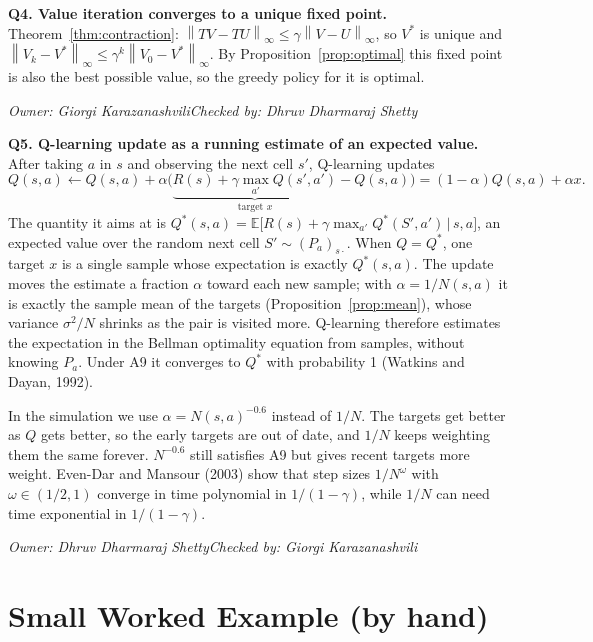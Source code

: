 \documentclass[10pt]{article}
\theoremstyle{definition}
\newcommand{\GK}{Giorgi Karazanashvili}
\newcommand{\DS}{Dhruv Dharmaraj Shetty}
\newcommand{\signoff}[2]{\par\smallskip\hfill\emph{Owner: #1}\qquad\emph{Checked by: #2}\par\medskip}
\newcommand{\E}{\mathbb{E}}
\newcommand{\norm}[1]{\left\lVert #1\right\rVert_\infty}
\begin{document}
\noindent\textbf{Q4. Value iteration converges to a unique fixed point.} Theorem~\ref{thm:contraction}: $\norm{TV-TU}\le\gamma\norm{V-U}$, so $V^*$ is unique and $\norm{V_k-V^*}\le\gamma^k\norm{V_0-V^*}$. By Proposition~\ref{prop:optimal} this fixed point is also the best possible value, so the greedy policy for it is optimal.
\signoff{\GK}{\DS}

\noindent\textbf{Q5. Q-learning update as a running estimate of an expected value.} After taking $a$ in $s$ and observing the next cell $s'$, Q-learning updates
\[
Q(s,a)\leftarrow Q(s,a) + \alpha\Big(\underbrace{R(s) + \gamma\max_{a'}Q(s',a')}_{\text{target }x} - Q(s,a)\Big) = (1-\alpha)Q(s,a) + \alpha x.
\]
The quantity it aims at is $Q^*(s,a) = \E\big[R(s) + \gamma\max_{a'}Q^*(S',a')\,\big|\,s,a\big]$, an expected value over the random next cell $S'\sim(P_a)_{s\cdot}$. When $Q = Q^*$, one target $x$ is a single sample whose expectation is exactly $Q^*(s,a)$. The update moves the estimate a fraction $\alpha$ toward each new sample; with $\alpha = 1/N(s,a)$ it is exactly the sample mean of the targets (Proposition~\ref{prop:mean}), whose variance $\sigma^2/N$ shrinks as the pair is visited more. Q-learning therefore estimates the expectation in the Bellman optimality equation from samples, without knowing $P_a$. Under A9 it converges to $Q^*$ with probability 1 (Watkins and Dayan, 1992).

In the simulation we use $\alpha = N(s,a)^{-0.6}$ instead of $1/N$. The targets get better as $Q$ gets better, so the early targets are out of date, and $1/N$ keeps weighting them the same forever. $N^{-0.6}$ still satisfies A9 but gives recent targets more weight. Even-Dar and Mansour (2003) show that step sizes $1/N^\omega$ with $\omega\in(1/2,1)$ converge in time polynomial in $1/(1-\gamma)$, while $1/N$ can need time exponential in $1/(1-\gamma)$.
\signoff{\DS}{\GK}

\section{Small Worked Example (by hand)}
\end{document}
